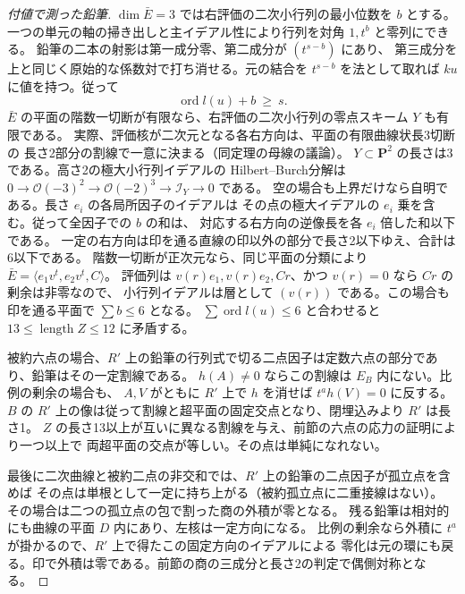 \begin{proof}[付値で測った鉛筆]
$\dim\bar E=3$ では右評価の二次小行列の最小位数を $b$ とする。
一つの単元の軸の掃き出しと主イデアル性により行列を対角 $1,t^b$ と零列にできる。
鉛筆の二本の射影は第一成分零、第二成分が $(t^{s-b})$ にあり、
第三成分を上と同じく原始的な係数対で打ち消せる。元の結合を $t^{s-b}$ を法として取れば
$ku$ に値を持つ。従って
\[
                \operatorname{ord} l(u)+b\ \ge\ s .
\]
$\bar E$ の平面の階数一切断が有限なら、右評価の二次小行列の零点スキーム $Y$ も有限である。
実際、評価核が二次元となる各右方向は、平面の有限曲線状長3切断の
長さ2部分の割線で一意に決まる（同定理の母線の議論）。
$Y\subset\mathbf P^2$ の長さは3である。高さ2の極大小行列イデアルの
Hilbert--Burch分解は $0\to\mathcal O(-3)^2\to\mathcal O(-2)^3\to\mathcal I_Y\to0$ である。
空の場合も上界だけなら自明である。長さ $e_i$ の各局所因子のイデアルは
その点の極大イデアルの $e_i$ 乗を含む。従って全因子での $b$ の和は、
対応する右方向の逆像長を各 $e_i$ 倍した和以下である。
一定の右方向は印を通る直線の印以外の部分で長さ2以下ゆえ、合計は6以下である。
階数一切断が正次元なら、同じ平面の分類により $\bar E=\langle e_1v^t,e_2v^t,C\rangle$。
評価列は $v(r)e_1,v(r)e_2,Cr$、かつ $v(r)=0$ なら $Cr$ の剰余は非零なので、
小行列イデアルは層として $(v(r))$ である。この場合も印を通る平面で $\sum b\le6$ となる。
$\sum\operatorname{ord} l(u)\le6$ と合わせると $13\le\operatorname{length}Z\le12$ に矛盾する。

被約六点の場合、$R'$ 上の鉛筆の行列式で切る二点因子は定数六点の部分であり、鉛筆はその一定割線である。
$h(A)\ne0$ ならこの割線は $E_B$ 内にない。比例の剰余の場合も、
$A,V$ がともに $R'$ 上で $h$ を消せば $t^a h(V)=0$ に反する。
$B$ の $R'$ 上の像は従って割線と超平面の固定交点となり、閉埋込みより $R'$ は長さ1。
$Z$ の長さ13以上が互いに異なる割線を与え、前節の六点の応力の証明により一つ以上で
両超平面の交点が等しい。その点は単純になれない。

最後に二次曲線と被約二点の非交和では、$R'$ 上の鉛筆の二点因子が孤立点を含めば
その点は単根として一定に持ち上がる（被約孤立点に二重接線はない）。
その場合は二つの孤立点の包で割った商の外積が零となる。
残る鉛筆は相対的にも曲線の平面 $D$ 内にあり、左核は一定方向になる。
比例の剰余なら外積に $t^a$ が掛かるので、$R'$ 上で得たこの固定方向のイデアルによる
零化は元の環にも戻る。印で外積は零である。前節の商の三成分と長さ2の判定で偶側対称となる。
\end{proof}

